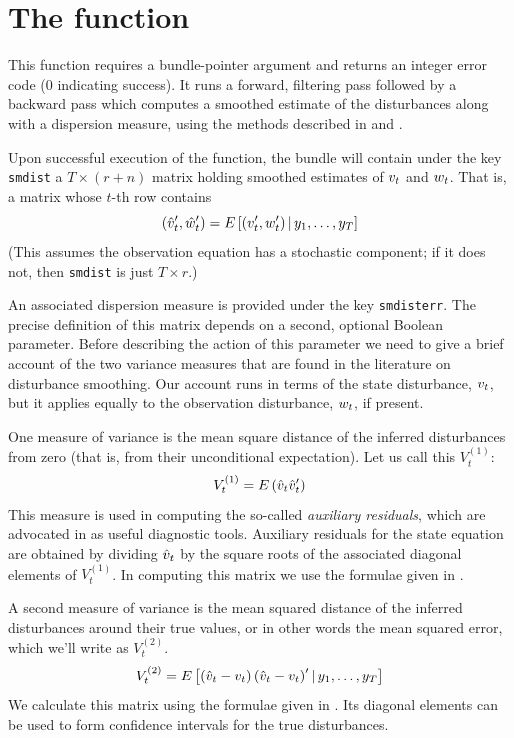 \section{The  function}
\label{sec:kdsmooth}

This function requires a bundle-pointer argument and returns an
integer error code (0 indicating success).  It runs a forward,
filtering pass followed by a backward pass which computes a smoothed
estimate of the disturbances along with a dispersion measure, using
the methods described in \cite{koopman93} and \cite{koopman-etal99}.

Upon successful execution of the function, the bundle will contain
under the key \texttt{smdist} a $T \times (r+n)$ matrix holding
smoothed estimates of $v_t$ and $w_t$. That is, a matrix
whose $t$-th row contains
\[
(\hat{v}_t' , \hat{w}_t')
 = E\left[ (v_t' , w_t') \,| \,
   y_1, \ldots, y_T \right]
\]
(This assumes the observation equation has a stochastic component; if
it does not, then \texttt{smdist} is just $T \times r$.)

An associated dispersion measure is provided under the key
\texttt{smdisterr}. The precise definition of this matrix depends on a
second, optional Boolean parameter. Before describing the action of
this parameter we need to give a brief account of the two variance
measures that are found in the literature on disturbance
smoothing. Our account runs in terms of the state disturbance,
$v_t$, but it applies equally to the observation disturbance,
$w_t$, if present.

One measure of variance is the mean square distance of the inferred
disturbances from zero (that is, from their unconditional
expectation). Let us call this $V^{(1)}_t$:
\[
V^{(1)}_t = E\left(\hat{v}_t\hat{v}_t'\right)
\]
This measure is used in computing the so-called \emph{auxiliary
  residuals}, which are advocated in \cite{durbin-koopman12} as useful
diagnostic tools. Auxiliary residuals for the state equation are
obtained by dividing $\hat{v}_t$ by the square roots of the
associated diagonal elements of $V^{(1)}_t$. In computing this matrix
we use the formulae given in \citet[section 4.4]{koopman-etal99}.

A second measure of variance is the mean squared distance of the
inferred disturbances around their true values, or in other words the
mean squared error, which we'll write as $V^{(2)}_t$.
\[
V^{(2)}_t = E\left[\left(\hat{v}_t - v_t\right)
  \left(\hat{v}_t - v_t\right)'
  | \,y_1, \ldots, y_T \right]
\] 
We calculate this matrix using the formulae given in \citet[section
4.5.2]{durbin-koopman12}. Its diagonal elements can be used to form
confidence intervals for the true disturbances.

